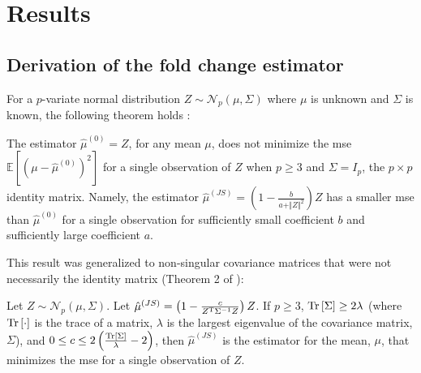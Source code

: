 \section{Results}

\subsection{Derivation of the  fold change estimator}
\label{sec:JS_derivation}

For a $p$-variate normal distribution $Z \sim \mathcal{N}_p(\mu, \Sigma)$ where $\mu$ is unknown and $\Sigma$ is known, the following theorem holds \cite{steinInadmissibilityUsualEstimator1956}:

\begin{theorem}
  The estimator $\hat{\mu}^{(0)} = Z$, for any mean $\mu$, does not minimize the \gls{mse} $\mathbb{E} \left[ (\mu - \hat{\mu}^{(0)})^2 \right]$ for a single observation of $Z$ when $p \ge 3$ and $\Sigma = I_p$, the $p \times p$ identity matrix.
  Namely, the estimator $\hat{\mu}^{(JS)} = \left( 1 - \frac{b}{a + \Vert Z \Vert ^2}\right) Z$ has a smaller \gls{mse} than $\hat{\mu}^{(0)}$ for a single observation for sufficiently small coefficient $b$ and sufficiently large coefficient $a$.
\end{theorem}

This result was generalized to non-singular covariance matrices that were not necessarily the identity matrix (Theorem 2 of \cite[REF][]{bockMinimaxEstimatorsMean1975}):

\begin{theorem}
  Let $Z \sim \mathcal{N}_p \left(\mu, \Sigma \right)$.
  Let $\hat{\mu}^{(JS)} = \left( 1 - \frac{c}{Z^{\mathrm{T}} \Sigma^{-1} Z}\right) Z$.
  If $p \ge 3$, $\mathrm{Tr} \left[ \Sigma \right] \ge 2 \lambda$ (where $\mathrm{Tr} \left[ \cdot \right]$ is the trace of a matrix, $\lambda$ is the largest eigenvalue of the covariance matrix, $\Sigma$), and $0 \le c \le 2 \left( \frac{\mathrm{Tr} \left[ \Sigma \right]}{\lambda} - 2 \right)$, then $\hat{\mu}^{(JS)}$ is the estimator for the mean, $\mu$, that minimizes the \gls{mse} for a single observation of $Z$.
  \label{thm:js}
\end{theorem}

